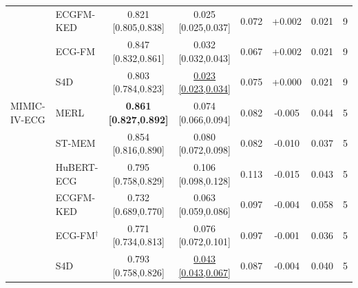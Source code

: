 \begin{table}[t]
\begin{tabular}{llcccccc}
   & ECGFM-KED & 0.821 [0.805,0.838] & 0.025 [0.025,0.037] & 0.072 & +0.002 & 0.021 & 9 \\
   & ECG-FM & 0.847 [0.832,0.861] & 0.032 [0.032,0.043] & 0.067 & +0.002 & 0.021 & 9 \\
   & S4D & 0.803 [0.784,0.823] & \underline{0.023 [0.023,0.034]} & 0.075 & +0.000 & 0.021 & 9 \\
  \midrule
  MIMIC-IV-ECG & MERL & \textbf{0.861 [0.827,0.892]} & 0.074 [0.066,0.094] & 0.082 & -0.005 & 0.044 & 5 \\
   & ST-MEM & 0.854 [0.816,0.890] & 0.080 [0.072,0.098] & 0.082 & -0.010 & 0.037 & 5 \\
   & HuBERT-ECG & 0.795 [0.758,0.829] & 0.106 [0.098,0.128] & 0.113 & -0.015 & 0.043 & 5 \\
   & ECGFM-KED & 0.732 [0.689,0.770] & 0.063 [0.059,0.086] & 0.097 & -0.004 & 0.058 & 5 \\
   & ECG-FM$^\dagger$ & 0.771 [0.734,0.813] & 0.076 [0.072,0.101] & 0.097 & -0.001 & 0.036 & 5 \\
   & S4D & 0.793 [0.758,0.826] & \underline{0.043 [0.043,0.067]} & 0.087 & -0.004 & 0.040 & 5 \\
\bottomrule
\end{tabular}
\end{table}